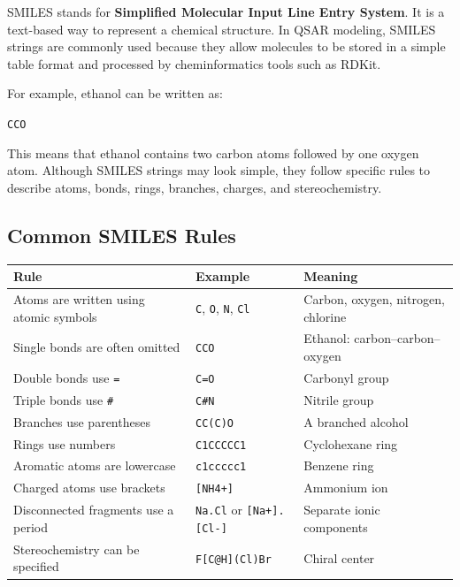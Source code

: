 \documentclass[11pt]{report}
\newenvironment{Important note}{\begin{quote}\color{red}\textbf{Important note:} }{\end{quote}}
\begin{document}
SMILES stands for \textbf{Simplified Molecular Input Line Entry System}. It is a text-based way to represent a chemical structure. In QSAR modeling, SMILES strings are commonly used because they allow molecules to be stored in a simple table format and processed by cheminformatics tools such as RDKit.

For example, ethanol can be written as:

\begin{center}
\texttt{CCO}
\end{center}

This means that ethanol contains two carbon atoms followed by one oxygen atom. Although SMILES strings may look simple, they follow specific rules to describe atoms, bonds, rings, branches, charges, and stereochemistry.

\subsection*{Common SMILES Rules}

\begin{center}
\begin{tabular}{p{}p{}p{}}
\toprule
\textbf{Rule} & \textbf{Example} & \textbf{Meaning} \\
\midrule
Atoms are written using atomic symbols & \texttt{C}, \texttt{O}, \texttt{N}, \texttt{Cl} & Carbon, oxygen, nitrogen, chlorine \\
Single bonds are often omitted & \texttt{CCO} & Ethanol: carbon--carbon--oxygen \\
Double bonds use \texttt{=} & \texttt{C=O} & Carbonyl group \\
Triple bonds use \texttt{\#} & \texttt{C\#N} & Nitrile group \\
Branches use parentheses & \texttt{CC(C)O} & A branched alcohol \\
Rings use numbers & \texttt{C1CCCCC1} & Cyclohexane ring \\
Aromatic atoms are lowercase & \texttt{c1ccccc1} & Benzene ring \\
Charged atoms use brackets & \texttt{[NH4+]} & Ammonium ion \\
Disconnected fragments use a period & \texttt{Na.Cl} or \texttt{[Na+].[Cl-]} & Separate ionic components \\
Stereochemistry can be specified & \texttt{F[C@H](Cl)Br} & Chiral center \\
\bottomrule
\end{tabular}
\end{center}
\end{document}
